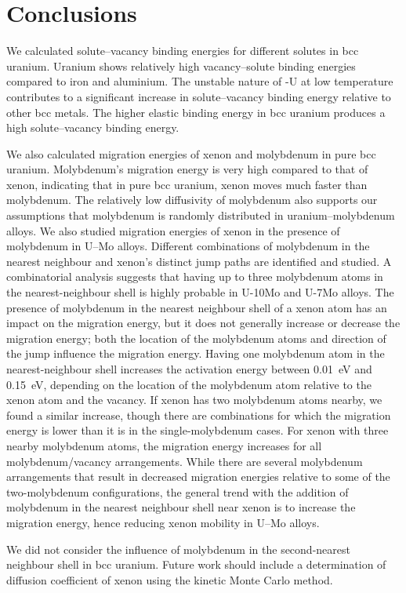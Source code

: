 \section{Conclusions}
We calculated solute--vacancy binding energies for different solutes in bcc
uranium. Uranium shows relatively high vacancy--solute binding energies compared to iron and aluminium. The unstable nature of \textgamma-U at low temperature contributes to a significant increase in solute--vacancy binding energy relative to other bcc metals. The higher elastic binding energy in bcc uranium produces a high solute--vacancy binding energy.

We also calculated migration energies of xenon and molybdenum in pure bcc
uranium. Molybdenum's migration energy is very high compared to that of xenon,
indicating that in pure bcc uranium, xenon moves much faster than molybdenum.
The relatively low diffusivity of molybdenum also supports our assumptions that molybdenum is randomly distributed in uranium--molybdenum alloys.
We also studied migration energies of xenon in the presence of molybdenum in
\mbox{U--Mo} alloys.
Different combinations of molybdenum in the nearest neighbour and xenon's
distinct jump paths are identified and studied.
A combinatorial analysis suggests that having up to three molybdenum atoms in
the nearest-neighbour shell is highly probable in U-10Mo and U-7Mo alloys.
The presence of molybdenum in the nearest neighbour shell of a xenon atom has
an impact on the migration energy, but it does not generally increase or
decrease the migration energy; both the location of the molybdenum atoms and
direction of the jump influence the migration energy.
Having one molybdenum atom in the nearest-neighbour shell increases the
activation energy between 0.01~eV and 0.15~eV, depending on the location of
the molybdenum atom relative to the xenon atom and the vacancy.
If xenon has two molybdenum atoms nearby, we found a similar increase,
though there are combinations for which the migration energy is lower than it
is in the single-molybdenum cases.
For xenon with three nearby molybdenum atoms,
the migration energy increases for all molybdenum/\allowbreak{}vacancy
arrangements.
While there are several molybdenum arrangements that result in decreased
migration energies relative to some of the two-molybdenum configurations,
the general trend with the addition of molybdenum in the nearest neighbour
shell near xenon is to increase the migration energy, hence reducing xenon
mobility in \mbox{U--Mo} alloys.
 
We did not consider the influence of molybdenum in the second-nearest neighbour
shell in bcc uranium. Future work should include a determination of diffusion
coefficient of xenon using  the kinetic Monte Carlo method.






